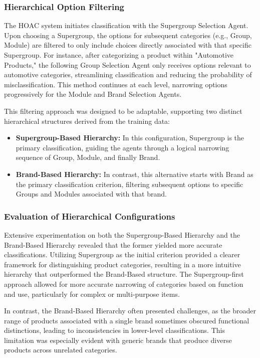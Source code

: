 \documentclass[9pt,a4paper,twoside]{rho-class/rho}
\begin{document}
\subsubsection{Hierarchical Option Filtering}
The HOAC system initiates classification with the Supergroup Selection Agent. Upon choosing a Supergroup, the options for subsequent categories (e.g., Group, Module) are filtered to only include choices directly associated with that specific Supergroup. For instance, after categorizing a product within "Automotive Products," the following Group Selection Agent only receives options relevant to automotive categories, streamlining classification and reducing the probability of misclassification. This method continues at each level, narrowing options progressively for the Module and Brand Selection Agents.

This filtering approach was designed to be adaptable, supporting two distinct hierarchical structures derived from the training data:
\begin{itemize}
    \item \textbf{Supergroup-Based Hierarchy:} In this configuration, Supergroup is the primary classification, guiding the agents through a logical narrowing sequence of Group, Module, and finally Brand.
    \item \textbf{Brand-Based Hierarchy:} In contrast, this alternative starts with Brand as the primary classification criterion, filtering subsequent options to specific Groups and Modules associated with that brand.
\end{itemize}

\subsubsection{Evaluation of Hierarchical Configurations}
Extensive experimentation on both the Supergroup-Based Hierarchy and the Brand-Based Hierarchy revealed that the former yielded more accurate classifications. Utilizing Supergroup as the initial criterion provided a clearer framework for distinguishing product categories, resulting in a more intuitive hierarchy that outperformed the Brand-Based structure. The Supergroup-first approach allowed for more accurate narrowing of categories based on function and use, particularly for complex or multi-purpose items.

In contrast, the Brand-Based Hierarchy often presented challenges, as the broader range of products associated with a single brand sometimes obscured functional distinctions, leading to inconsistencies in lower-level classifications. This limitation was especially evident with generic brands that produce diverse products across unrelated categories.
\end{document}
